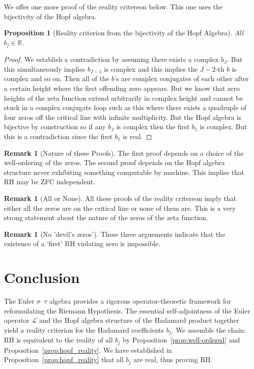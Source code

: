\documentclass[12pt]{article}
\theoremstyle{plain}
\newtheorem{proposition}[theorem]{Proposition}
\theoremstyle{definition}
\newtheorem{remark}[theorem]{Remark}
\newcommand{\R}{\mathbb{R}}
\begin{document}
We offer one more proof of the reality critereon below. This one uses the bijectivity of the Hopf algebra.
\begin{proposition}[Reality criterion from the bijectivity of the Hopf Algebra]\label{prop:bij_hopf_reality}
  All $b_j \in \R$.
\end{proposition}
\begin{proof}
 We establish a contradiction by assuming there exists a complex $b_J$. But this simultaneously implies $b_{J-1}$ is complex and this implies the $J-2$-th $b$ is complex and so on. Then all of the $b$'s are complex conjugates of each other after a certain height where the first offending zero appears. 
  But we know that zero heights of the zeta function extend arbitrarily in complex height and cannot be stuck in a complex conjugate loop such as this where there exists a quadruple of four zeros off the critical line with infinite multiplicity. But the Hopf algebra is bijective by construction so if any $b_J$ is complex then the first $b_1$ is complex. 
  But this is a contradiction since the first $b_1$ is real. 
\end{proof}
\begin{remark}[Nature of these Proofs]
  The first proof depends on a choice of the well-ordering of the zeros. The second proof depends on the Hopf algebra structure never exhibiting something computable by machine. This implies that RH may be ZFC independent. 
\end{remark}
\begin{remark}[All or None]
  All these proofs of the reality critereon imply that either all the zeros are on the critical line or none of them are. This is a very strong statement about the nature of the zeros of the zeta function.
\end{remark}
\begin{remark}[No 'devil's zeros']
  These three arguements indicate that the existence of a 'first' RH violating zero is impossible. 
\end{remark}
  \section{Conclusion}\label{sec:conclusion}
The Euler $\sigma$--$\tau$ algebra provides a rigorous operator-theoretic framework for
reformulating the Riemann Hypothesis. The essential self-adjointness of the Euler operator $\mathcal{L}$ and the Hopf algebra structure of the Hadamard product together yield a reality criterion for the Hadamard coefficients $b_j$. 
We assemble the chain: RH is equivalent to the reality of all $b_j$ by Proposition~\ref{prop:well-ordered} and Proposition~\ref{prop:hopf_reality}. We have established in Proposition~\ref{prop:hopf_reality} that all $b_j$ are real, thus proving RH.
\end{document}
